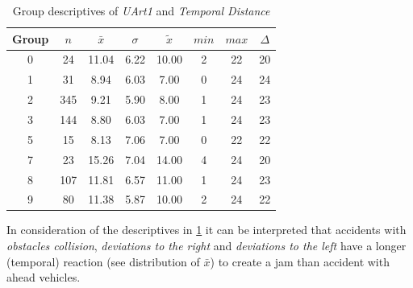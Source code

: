 \begin{table}[ht]
	\tiny
	\centering
    \begin{tabular}{c|c|c|c|c|c|c|c}
        \toprule
        Group & $n$ & $\bar{x}$ & $\sigma$ & $\tilde{x}$ & $min$ & $max$ & $\Delta$ \\
        \midrule
        0 & 24  & 11.04 & 6.22 & 10.00 & 2  & 22 & 20 \\ 
        1 & 31  & 8.94  & 6.03 & 7.00  & 0  & 24 & 24 \\ 
        2 & 345 & 9.21  & 5.90 & 8.00  & 1  & 24 & 23 \\ 
        3 & 144 & 8.80  & 6.03 & 7.00  & 1  & 24 & 23 \\ 
        5 & 15  & 8.13  & 7.06 & 7.00  & 0  & 22 & 22 \\ 
        7 & 23  & 15.26 & 7.04 & 14.00 & 4  & 24 & 20 \\ 
        8 & 107 & 11.81 & 6.57 & 11.00 & 1  & 24 & 23 \\ 
        9 & 80  & 11.38 & 5.87 & 10.00 & 2  & 24 & 22 \\ 
        \bottomrule
      \end{tabular}
    \caption{Group descriptives of \textit{UArt1} and \textit{Temporal Distance}}
    \label{tbl:descriptives_baysis_initiator_UArt_TDist}
\end{table}
In consideration of the descriptives in \cref{tbl:descriptives_baysis_initiator_UArt_TDist} it can be interpreted that accidents with \textit{obstacles collision}, \textit{deviations to the right} and \textit{deviations to the left} have a longer (temporal) reaction (see distribution of $\bar{x}$) to create a jam than accident with ahead vehicles.

